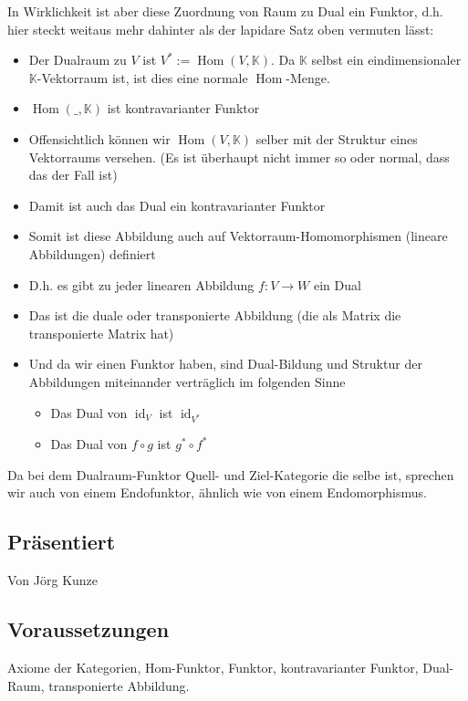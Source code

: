 \documentclass[a4paper]{amsart}
\theoremstyle{definition}
\DeclareMathOperator{\id}{id}
\DeclareMathOperator{\Hom}{Hom}
\newcommand{\K}{\ensuremath{\mathbb{ K }}}
\begin{document}
In Wirklichkeit ist aber diese Zuordnung von Raum zu Dual ein Funktor, d.h. hier steckt weitaus mehr 
dahinter als der lapidare Satz oben vermuten lässt:
\begin{itemize}
	\item Der Dualraum zu $V$ ist $V^* := \Hom( V, \K)$. Da $\K$ selbst ein eindimensionaler 
		$\K$-Vektorraum ist, ist dies eine normale $\Hom$-Menge.
	\item $\Hom( \_, \K)$ ist kontravarianter Funktor
	\item Offensichtlich können wir $\Hom( V, \K)$ selber mit der Struktur eines Vektorraums versehen.
		(Es ist überhaupt nicht immer so oder normal, dass das der Fall ist)
	\item Damit ist auch das Dual ein kontravarianter Funktor
	\item Somit ist diese Abbildung auch auf Vektorraum-Homomorphismen (lineare Abbildungen) definiert
	\item D.h. es gibt zu jeder linearen Abbildung $f \colon V \to W$ ein Dual
	\item Das ist die duale oder transponierte Abbildung (die als Matrix die transponierte Matrix hat)
	\item Und da wir einen Funktor haben, sind Dual-Bildung und Struktur der Abbildungen miteinander
		verträglich im folgenden Sinne
		\begin{itemize}
			\item Das Dual von $\id_V$ ist $\id_{V^*}$
			\item Das Dual von $f \circ g$ ist $g^* \circ f^*$
		\end{itemize}
\end{itemize}

Da bei dem Dualraum-Funktor Quell- und Ziel-Kategorie die selbe ist, sprechen wir auch von einem Endofunktor, ähnlich wie von einem Endomorphismus.

\subsection*{Präsentiert}
Von Jörg Kunze

\subsection*{Voraussetzungen}
Axiome der Kategorien, Hom-Funktor, Funktor, kontravarianter Funktor, Dual-Raum, transponierte Abbildung.
\end{document}
